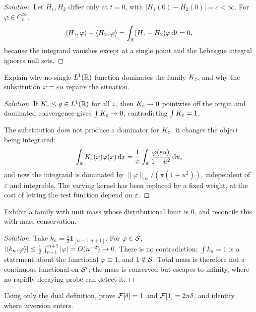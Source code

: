 \begin{proof}[Solution]
Let $H_{1},H_{2}$ differ only at $t=0$, with $|H_{1}(0)-H_{2}(0)|=c<\infty$. For
$\varphi\in C_{c}^{\infty}$,
\begin{equation}
\langle H_{1},\varphi\rangle-\langle H_{2},\varphi\rangle
=\int_{\mathbb{R}}(H_{1}-H_{2})\varphi\,\mathrm{d} t=0 ,
\end{equation}
because the integrand vanishes except at a single point and the Lebesgue integral ignores null sets.
\end{proof}

\begin{exercise}\label{ex7}
Explain why no single $L^{1}(\mathbb{R})$ function dominates the family $K_{\varepsilon}$, and why the substitution
$x=\varepsilon u$ repairs the situation.
\end{exercise}

\begin{proof}[Solution]
If $K_{\varepsilon}\le g\in L^{1}(\mathbb{R})$ for all $\varepsilon$, then $K_{\varepsilon}\to0$ pointwise off the origin and dominated
convergence gives $\int K_{\varepsilon}\to0$, contradicting $\int K_{\varepsilon}=1$.

The substitution does not produce a dominator for $K_{\varepsilon}$; it changes the object being integrated:
\begin{equation}
\int_{\mathbb{R}}K_{\varepsilon}(x)\varphi(x)\,\mathrm{d} x=\frac{1}{\pi}\int_{\mathbb{R}}\frac{\varphi(\varepsilon u)}{1+u^{2}}\,\mathrm{d} u ,
\end{equation}
and now the integrand is dominated by $\|\varphi\|_{\infty}/(\pi(1+u^{2}))$, independent of $\varepsilon$ and
integrable. The varying kernel has been replaced by a fixed weight, at the cost of letting the test
function depend on $\varepsilon$.
\end{proof}

\begin{exercise}\label{ex8}
Exhibit a family with unit mass whose distributional limit is $0$, and reconcile this with mass
conservation.
\end{exercise}

\begin{proof}[Solution]
Take $k_{n}=\tfrac12\mathbf{1}_{[n-1,n+1]}$. For $\varphi\in\mathcal{S}$,
$|\langle k_{n},\varphi\rangle|\le\tfrac12\int_{n-1}^{n+1}|\varphi|=O(n^{-2})\to0$. There is no contradiction:
$\int k_{n}=1$ is a statement about the functional $\varphi\equiv1$, and $1\notin\mathcal{S}$. Total mass is
therefore not a continuous functional on $\mathcal{S}'$; the mass is conserved but escapes to infinity, where
no rapidly decaying probe can detect it.
\end{proof}

\begin{exercise}\label{ex9}
Using only the dual definition, prove $\mathcal{F}[\delta]=1$ and $\mathcal{F}[1]=2\pi\delta$, and identify where
inversion enters.
\end{exercise}

